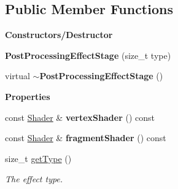 \subsection*{Public Member Functions}
\begin{Indent}\textbf{ Constructors/\+Destructor}\par
\begin{DoxyCompactItemize}
\item 
\mbox{\label{classrev_1_1_post_processing_effect_stage_a583b58e24d4515015a543a68e0d54cea}} 
{\bfseries Post\+Processing\+Effect\+Stage} (size\+\_\+t type)
\item 
\mbox{\label{classrev_1_1_post_processing_effect_stage_a4ceb9f977eb732a8d541050c10b7799a}} 
virtual {\bfseries $\sim$\+Post\+Processing\+Effect\+Stage} ()
\end{DoxyCompactItemize}
\end{Indent}
\begin{Indent}\textbf{ Properties}\par
\begin{DoxyCompactItemize}
\item 
\mbox{\label{classrev_1_1_post_processing_effect_stage_ae2bca5c63be0d5ece5f122dfacd43ed2}} 
const \mbox{\hyperlink{classrev_1_1_shader}{Shader}} \& {\bfseries vertex\+Shader} () const
\item 
\mbox{\label{classrev_1_1_post_processing_effect_stage_ac23bd1397aef3dcdd166058174700c2d}} 
const \mbox{\hyperlink{classrev_1_1_shader}{Shader}} \& {\bfseries fragment\+Shader} () const
\item 
\mbox{\label{classrev_1_1_post_processing_effect_stage_a62d087afa89104bd6224534f62b2cb3b}} 
size\+\_\+t \mbox{\hyperlink{classrev_1_1_post_processing_effect_stage_a62d087afa89104bd6224534f62b2cb3b}{get\+Type}} ()
\begin{DoxyCompactList}\small\item\em The effect type. \end{DoxyCompactList}\end{DoxyCompactItemize}
\end{Indent}
